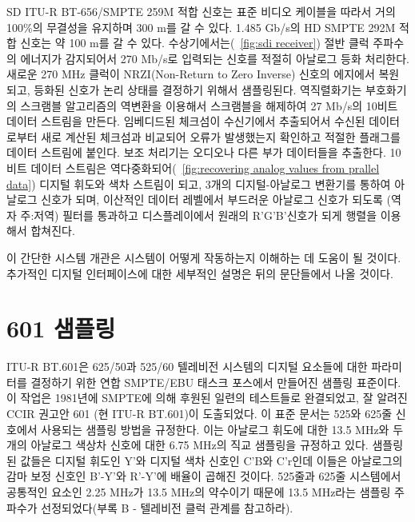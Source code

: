 SD ITU-R BT-656/SMPTE 259M 적합 신호는 표준 비디오 케이블을 따라서 거의 100\%의 무결성을 유지하며 300 m를 갈 수 있다. 1.485 Gb/s의 HD SMPTE 292M 적합 신호는 약 100 m를 갈 수 있다.
수상기에서는(\figurename~\ref{fig:sdi receiver}) 절반 클럭 주파수의 에너지가 감지되어서 270 Mb/s로 입력되는 신호를 적절히 아날로그 등화 처리한다. 새로운 270 MHz 클럭이 NRZI(Non-Return to Zero Inverse) 신호의 에지에서 복원되고, 등화된 신호가 논리 상태를 결정하기 위해서 샘플링된다.
역직렬화기는 부호화기의 스크램블 알고리즘의 역변환을 이용해서 스크램블을 해제하여 27 Mb/s의 10비트 데이터 스트림을 만든다. 임베디드된 체크섬이 수신기에서 추출되어서 수신된 데이터로부터 새로 계산된 체크섬과 비교되어 오류가 발생했는지 확인하고 적절한 플래그를 데이터 스트림에 붙인다.
보조 처리기는 오디오나 다른 부가 데이터들을 추출한다.
10비트 데이터 스트림은 역다중화되어(\figurename~\ref{fig:recovering analog values from prallel data}) 디지털 휘도와 색차 스트림이 되고, 3개의 디지털-아날로그 변환기를 통하여 아날로그 신호가 되며, 이산적인 데이터 레벨에서 부드러운 아날로그 신호가 되도록 (역자 주:저역) 필터를 통과하고 디스플레이에서 원래의 R'G'B'신호가 되게 행렬을 이용해서 합쳐진다.


이 간단한 시스템 개관은 시스템이 어떻게 작동하는지 이해하는 데 도움이 될 것이다. 추가적인 디지털 인터페이스에 대한 세부적인 설명은 뒤의 문단들에서 나올 것이다.

\section{601 샘플링}
ITU-R BT.601은 625/50과 525/60 텔레비전 시스템의 디지털 요소들에 대한 파라미터를 결정하기 위한 연합 SMPTE/EBU 태스크 포스에서 만들어진 샘플링 표준이다.
이 작업은 1981년에 SMPTE에 의해 후원된 일련의 테스트들로 완결되었고, 잘 알려진 CCIR 권고안 601 (현 ITU-R BT.601)이 도출되었다.
이 표준 문서는 525와 625줄 신호에서 사용되는 샘플링 방법을 규정한다. 이는 아날로그 휘도에 대한 13.5 MHz와 두 개의 아날로그 색상차 신호에 대한 6.75 MHz의 직교 샘플링을 규정하고 있다.
샘플링된 값들은 디지털 휘도인 Y'와 디지털 색차 신호인 C'B와 C'r인데 이들은 아날로그의 감마 보정 신호인 B'-Y'와 R'-Y'에 배율이 곱해진 것이다.
525줄과 625줄 시스템에서 공통적인 요소인 2.25 MHz가 13.5 MHz의 약수이기 때문에 13.5 MHz라는 샘플링 주파수가 선정되었다(부록 B - 텔레비전 클럭 관계를 참고하라).


